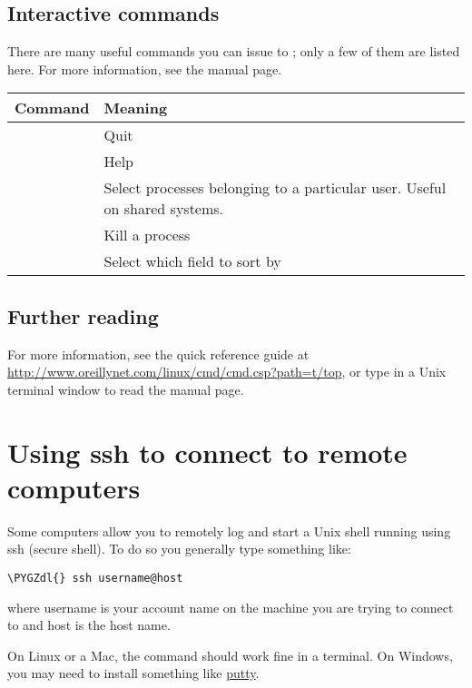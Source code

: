 \documentclass[letterpaper,10pt,english]{sphinxmanual}
\def\PYGZdl{\char`\$}
\begin{document}
\subsection{Interactive commands}
\label{top:interactive-commands}
There are many useful commands you can issue to ; only a few of
them are listed here.  For more information, see the  manual
page.

\begin{tabulary}{\linewidth}{|L|L|}
\hline
\textsf{\relax 
Command
} & \textsf{\relax 
Meaning
}\\
\hline
{}
 & 
Quit
\\
\hline
{}
 & 
Help
\\
\hline
{}
 & 
Select processes belonging to a particular user.  Useful on shared systems.
\\
\hline
{}
 & 
Kill a process
\\
\hline
{}
 & 
Select which field to sort by
\\
\hline\end{tabulary}



\subsection{Further reading}
\label{top:further-reading}
For more information, see the quick reference guide at
\url{http://www.oreillynet.com/linux/cmd/cmd.csp?path=t/top}, or type
 in a Unix terminal window to read the manual page.


\section{Using ssh to connect to remote computers}
\label{ssh:using-ssh-to-connect-to-remote-computers}\label{ssh::doc}\label{ssh:ssh}
Some computers allow you to remotely log and start a Unix shell running
using ssh (secure shell).  To do so you generally type something like:

\begin{Verbatim}[commandchars=\\\{\}]
\PYGZdl{} ssh username@host
\end{Verbatim}

where username is your account name on the machine you are trying to connect
to and host is the host name.

On Linux or a
Mac, the  command should work fine in a terminal.  On Windows, you may
need to install something like \href{http://www.putty.org/}{putty}.
\end{document}
